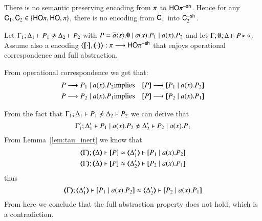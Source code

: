 \begin{theorem}\rm
There is no semantic preserving encoding 
from $\pi$ to $\mathsf{HO}\pi^{\mathsf{-sh}}$. Hence 
for any $\mathsf{C}_1,\mathsf{C}_2\in \{ \mathsf{HO}\pi, \mathsf{HO}, \pi\}$, 
there is no encoding from $\mathsf{C}_1$ into $\mathsf{C}_2^{-\mathsf{sh}}$.  
\end{theorem}
\begin{IEEEproof}
	Let $\horel{\Gamma_1}{\Delta_1}{P_1}{\not\wb}{\Delta_2}{P_2}$
	with $P = \overline{a} \langle s \rangle . \mathbf{0} \;|\; a (x) . P_1 \;|\; a (x) . P_2$ and	let $\Gamma; \emptyset; \Delta \vdash P \triangleright \diamond$.
	Assume also a encoding
	$\enc{\cdot}{\cdot}: \sessp \longrightarrow \HOp^{\minussh}$
	that enjoys
	operational correspondence and full abstraction.

	From operational correspondence we get that:
	\begin{eqnarray*}
		P \red P_1 \Par \bacc{a}{x} P_2 &\textrm{implies}& \map{P} \red \map{P_1 \Par \bacc{a}{x} P_2}\\
		P \red P_2 \Par \bacc{a}{x} P_1 &\textrm{implies}& \map{P} \red \map{P_2 \Par \bacc{a}{x} P_1}
	\end{eqnarray*}

	From the fact that
	$\horel{\Gamma_1}{\Delta_1}{P_1}{\not\wb}{\Delta_2}{P_2}$
	we can derive that
%
	\[
		\horel{\Gamma_1'}{\Delta_1'}{P_1 \Par \bacc{a}{x} P_2}{\not\wb}{\Delta_2'}{P_2 \Par \bacc{a}{x} P_1}
	\]
%
	From Lemma~\ref{lem:tau_inert} we know that
%
	\begin{eqnarray*}
		\horel{\mapt{\Gamma}}{\mapt{\Delta}}{\map{P}}{\wb}{\mapt{\Delta_1'}}{\map{P_1 \Par \bacc{a}{x} P_2}}\\
		\horel{\mapt{\Gamma}}{\mapt{\Delta}}{\map{P}}{\wb}{\mapt{\Delta_2'}}{\map{P_2 \Par \bacc{a}{x} P_1}}
	\end{eqnarray*}
%
	\noi thus
	\[
		\horel{\mapt{\Gamma}}{\mapt{\Delta_1'}}{\map{P_1 \Par \bacc{a}{x} P_2}}{\wb}{\mapt{\Delta_2'}}{\map{P_2 \Par \bacc{a}{x} P_1}}
	\]
%
	From here we conclude that the full abstraction property does not hold,
	which is a contradiction.
\end{IEEEproof}


